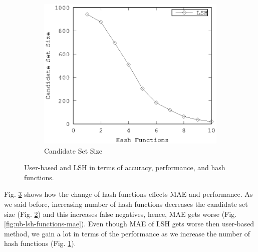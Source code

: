 \documentclass[conference]{IEEEtran}
\begin{document}
\begin{figure}[!h]
\begin{subfigure}[b]{0.225\textwidth}
                \label{fig:ub-lsh-functions-runtime}
        \end{subfigure} 
        \\
         \begin{subfigure}[b]{0.225\textwidth}
                \includegraphics[width=\textwidth]{charts/lsh-canidate-hash-functions.eps}
                \caption{Candidate Set Size}
                \label{fig:lsh-functions-candidate-size}
        \end{subfigure} 
        \caption{User-based and LSH in terms of accuracy, performance, and hash functions.}
        \label{fig:ub-lsh-functions}
\end{figure}

Fig. \ref{fig:ub-lsh-functions} shows how the change of 
hash functions effects MAE and performance. As we said before, increasing number of 
hash functions decreases the candidate set size (Fig. \ref{fig:lsh-functions-candidate-size}) 
and this increases false negatives, hence, MAE gets worse (Fig. \ref{fig:ub-lsh-functions-mae}). 
Even though MAE of LSH gets worse then user-based method, we gain a lot in 
terms of the performance as we increase the number of hash functions (Fig. \ref{fig:ub-lsh-functions-runtime}). 
\end{document}
